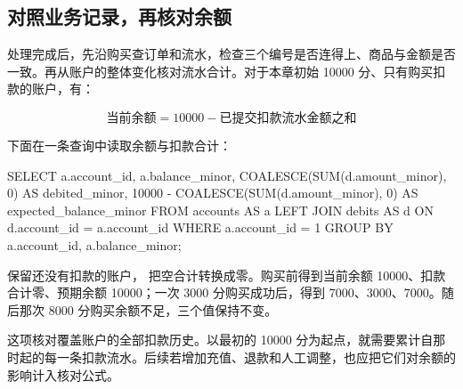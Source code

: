 \subsection*{对照业务记录，再核对余额}

处理完成后，先沿购买查订单和流水，检查三个编号是否连得上、商品与金额是否一致。再从账户的整体变化核对流水合计。对于本章初始 10000 分、只有购买扣款的账户，有：

\[
  \mbox{当前余额}
  = 10000 - \mbox{已提交扣款流水金额之和}
\]

下面在一条查询中读取余额与扣款合计：

\begin{BookCode}
SELECT a.account_id, a.balance_minor,
       COALESCE(SUM(d.amount_minor), 0) AS debited_minor,
       10000 - COALESCE(SUM(d.amount_minor), 0)
           AS expected_balance_minor
FROM accounts AS a
LEFT JOIN debits AS d ON d.account_id = a.account_id
WHERE a.account_id = 1
GROUP BY a.account_id, a.balance_minor;
\end{BookCode}

 保留还没有扣款的账户， 把空合计转换成零。购买前得到当前余额 10000、扣款合计零、预期余额 10000；一次 3000 分购买成功后，得到 7000、3000、7000。随后那次 8000 分购买余额不足，三个值保持不变。

这项核对覆盖账户的全部扣款历史。以最初的 10000 分为起点，就需要累计自那时起的每一条扣款流水。后续若增加充值、退款和人工调整，也应把它们对余额的影响计入核对公式。
